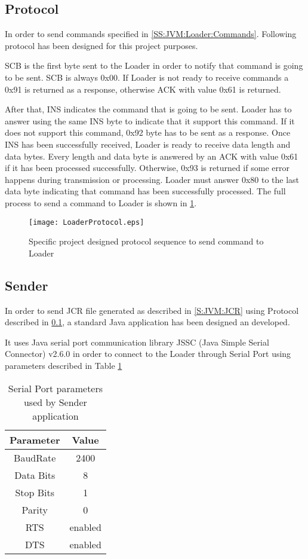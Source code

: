 \subsection{Protocol}\label{SS:JVM:Loader:Protocol}
In order to send commands specified in \ref{SS:JVM:Loader:Commands}. Following protocol has been designed for this project purposes.

SCB is the first byte sent to the Loader in order to notify that command is going to be sent. SCB is always 0x00. If Loader is not ready to receive commands a 0x91 is returned as a response, otherwise ACK with value 0x61 is returned.

After that, INS indicates the command that is going to be sent. Loader has to answer using the same INS byte to indicate that it support this command. If it does not support this command, 0x92 byte has to be sent as a response.
Once INS has been successfully received, Loader is ready to receive data length and data bytes. Every length and data byte is answered by an ACK with value 0x61 if it has been processed successfully. Otherwise, 0x93 is returned if some error happens during transmission or processing. Loader must answer 0x80 to the last data byte indicating that command has been successfully processed. The full process to send a command to Loader is shown in \ref{fig:SS:JVM:Loader:ProtocolSeq}.

\begin{figure}[H]
\centering
\texttt{[image: LoaderProtocol.eps]}
\caption{Specific project designed protocol sequence to send command to Loader}
\label{fig:SS:JVM:Loader:ProtocolSeq}
\end{figure}

\subsection{Sender}\label{SS:JVM:Loader:Sender}
In order to send JCR file generated as described in \ref{S:JVM:JCR} using Protocol described in \ref{SS:JVM:Loader:Protocol}, a standard Java application has been designed an developed.

It uses Java serial port communication library JSSC (Java Simple Serial Connector) v2.6.0 in order to connect to the Loader through Serial Port using parameters described in Table \ref{tab:SS:JVM:Loader:Sender:Params}

\begin{table}[!htb]
\centering
\begin{tabular}{|c|c|}
\hline 
Parameter & Value \\ 
\hline 
BaudRate & 2400 \\ 
\hline 
Data Bits & 8 \\ 
\hline 
Stop Bits & 1 \\ 
\hline 
Parity & 0 \\ 
\hline 
RTS & enabled \\ 
\hline 
DTS & enabled \\ 
\hline 
\end{tabular}
\caption{Serial Port parameters used by Sender application}
\label{tab:SS:JVM:Loader:Sender:Params}
\end{table}

